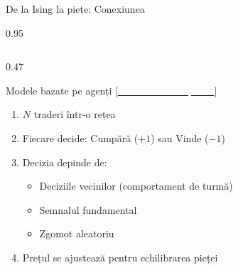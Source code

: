 \documentclass[9pt, aspectratio=169, t]{beamer}
\begin{document}
\begin{frame}{De la Ising la piețe: Conexiunea}
    \begin{cminipage}{0.95\textwidth}
    {\scriptsize
    \begin{columns}[T]
        \begin{column}{0.47\textwidth}
            \begin{block}{Modele bazate pe agenți {\scriptsize[\href{https://doi.org/10.1038/17290}{\textcolor{white}{Lux \& Marchesi, 1999}}]}}
                \begin{enumerate}\setlength{\itemsep}{1pt}
                    \item $N$ traderi într-o rețea
                    \item Fiecare decide: Cumpără ($+1$) sau Vinde ($-1$)
                    \item Decizia depinde de:
                    \begin{itemize}\setlength{\itemsep}{0pt}
                        \item Deciziile vecinilor (comportament de turmă)
                        \item Semnalul fundamental
                        \item Zgomot aleatoriu
                    \end{itemize}
                    \item Prețul se ajustează pentru echilibrarea pieței
                \end{enumerate}
            \end{block}


\end{column}
\end{columns}}
\end{cminipage}
\end{frame}
\end{document}
